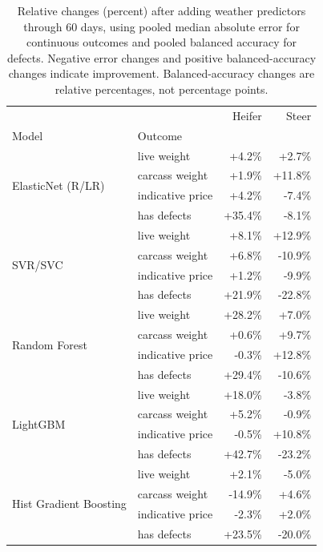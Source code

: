 \begin{table}
\caption{Relative changes (percent) after adding weather predictors through 60 days, using pooled median absolute error for continuous outcomes and pooled balanced accuracy for defects. Negative error changes and positive balanced-accuracy changes indicate improvement. Balanced-accuracy changes are relative percentages, not percentage points.}
\label{tab:beef:ablation_median}
\begin{tabular}{llrr}
\toprule
 &  & Heifer & Steer \\
Model & Outcome &  &  \\
\midrule
\multirow[t]{4}{*}{ElasticNet (R/LR)} & live weight & +4.2\% & +2.7\% \\
 & carcass weight & +1.9\% & +11.8\% \\
 & indicative price & +4.2\% & -7.4\% \\
 & has defects & +35.4\% & -8.1\% \\
\cline{1-4}
\multirow[t]{4}{*}{SVR/SVC} & live weight & +8.1\% & +12.9\% \\
 & carcass weight & +6.8\% & -10.9\% \\
 & indicative price & +1.2\% & -9.9\% \\
 & has defects & +21.9\% & -22.8\% \\
\cline{1-4}
\multirow[t]{4}{*}{Random Forest} & live weight & +28.2\% & +7.0\% \\
 & carcass weight & +0.6\% & +9.7\% \\
 & indicative price & -0.3\% & +12.8\% \\
 & has defects & +29.4\% & -10.6\% \\
\cline{1-4}
\multirow[t]{4}{*}{LightGBM} & live weight & +18.0\% & -3.8\% \\
 & carcass weight & +5.2\% & -0.9\% \\
 & indicative price & -0.5\% & +10.8\% \\
 & has defects & +42.7\% & -23.2\% \\
\cline{1-4}
\multirow[t]{4}{*}{Hist Gradient Boosting} & live weight & +2.1\% & -5.0\% \\
 & carcass weight & -14.9\% & +4.6\% \\
 & indicative price & -2.3\% & +2.0\% \\
 & has defects & +23.5\% & -20.0\% \\
\cline{1-4}
\bottomrule
\end{tabular}
\end{table}
